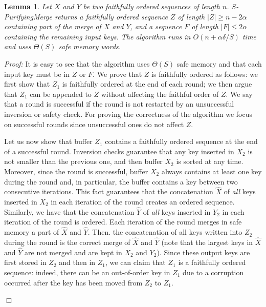 \documentclass[review,number]{elsarticle}
\newcommand{\BO}[1]{{O}\left(#1\right)}
\newcommand{\BT}[1]{{\Theta}\left(#1\right)}
\newtheorem{lemma}{Lemma}
\renewenvironment{proof}{\begin{trivlist}
                         \item[] {\em Proof:}}{\hfill $\Box$
                       \end{trivlist}}
\newcommand{\X}{{X}}
\newcommand{\Y}{{Y}}
\newcommand{\Z}{{Z}}
\newcommand{\SPurifyingMerge}{$S$-\textsf{PurifyingMerge}}
\begin{document}
\begin{lemma}\label{lem:purify}
Let $X$ and $Y$ be two faithfully ordered sequences of length $n$.
\SPurifyingMerge{} returns a faithfully ordered sequence $Z$ of length $\vert Z
\vert \geq n- 2\alpha$ containing part of the merge of $X$ and $Y$, and a
sequence $F$ of length $\vert F \vert \leq 2\alpha$ containing the remaining
input keys. The algorithm runs in $\BO{n+\alpha\delta/S}$ time and uses
$\BT{S}$ safe memory words.
\end{lemma}
\begin{proof}
It is easy to see that the algorithm uses $\BT{S}$ safe memory and that each
input key must be in $Z$ or $F$. We prove that $Z$ is faithfully ordered as
follows: we first show that $\Z_1$ is faithfully ordered at the end of each
round; we then argue that $\Z_1$ can be appended to $Z$ without affecting the
faithful order of $Z$. We say that a round is successful if the round is not
restarted by an unsuccessful  inversion or safety check. For proving the
correctness of the algorithm we focus on successful rounds since unsuccessful
ones do not affect $Z$. 

Let us now show that buffer $\Z_1$ contains a faithfully ordered sequence at the
end of a successful round. Inversion checks guarantee that any key inserted in
$\X_2$ is not smaller than the previous one, and then buffer $\X_2$ is sorted at
any time. Moreover, since the round is successful, buffer $\X_2$ always contains
at least one key during the round and, in particular, the buffer contains a key
between two consecutive iterations. This fact guarantees that the concatenation
$\hat X$ of \emph{all} keys inserted in $\X_2$ in each iteration of the round
creates an ordered sequence. Similarly, we have that the concatenation $\hat Y$
of \emph{all} keys inserted in $\Y_2$ in each iteration of the round is ordered.
Each iteration of the round merges in safe memory a part of $\hat X$ and $\hat
Y$. Then. the concatenation of all keys written into $\Z_2$ during the round is
the correct merge of $\hat X$ and $\hat Y$ (note that the largest keys in $\hat
X$ and $\hat Y$  are not merged and are kept in $\X_2$ and $\Y_2$).  Since these
output keys are first stored in $\Z_2$ and then in $\Z_1$, we can claim that
$\Z_1$ is a faithfully ordered sequence: indeed, there can be an out-of-order
key in $\Z_1$ due to a corruption occurred after the key has been moved from
$Z_2$ to $\Z_1$.


\end{proof}
\end{document}
